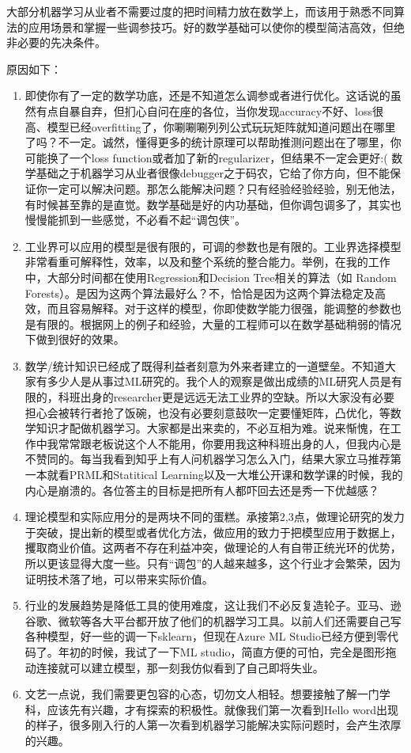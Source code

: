 \documentclass[]{ctexbook}
\begin{document}
大部分机器学习从业者不需要过度的把时间精力放在数学上，而该用于熟悉不同算法的应用场景和掌握一些调参技巧。好的数学基础可以使你的模型简洁高效，但绝非必要的先决条件。

原因如下：

\begin{enumerate}
\def\labelenumi{\arabic{enumi}.}
\item
  即使你有了一定的数学功底，还是不知道怎么调参或者进行优化。这话说的虽然有点自暴自弃，但扪心自问在座的各位，当你发现accuracy不好、loss很高、模型已经overfitting了，你唰唰唰列列公式玩玩矩阵就知道问题出在哪里了吗？不一定。诚然，懂得更多的统计原理可以帮助推测问题出在了哪里，你可能换了一个loss function或者加了新的regularizer，但结果不一定会更好:( 数学基础之于机器学习从业者很像debugger之于码农，它给了你方向，但不能保证你一定可以解决问题。那怎么能解决问题？只有经验经验经验，别无他法，有时候甚至靠的是直觉。数学基础是好的内功基础，但你调包调多了，其实也慢慢能抓到一些感觉，不必看不起``调包侠''。
\item
  工业界可以应用的模型是很有限的，可调的参数也是有限的。工业界选择模型非常看重可解释性，效率，以及和整个系统的整合能力。举例，在我的工作中，大部分时间都在使用Regression和Decision Tree相关的算法（如 Random Forests）。是因为这两个算法最好么？不，恰恰是因为这两个算法稳定及高效，而且容易解释。对于这样的模型，你即使数学能力很强，能调整的参数也是有限的。根据网上的例子和经验，大量的工程师可以在数学基础稍弱的情况下做到很好的效果。
\item
  数学/统计知识已经成了既得利益者刻意为外来者建立的一道壁垒。不知道大家有多少人是从事过ML研究的。我个人的观察是做出成绩的ML研究人员是有限的，科班出身的researcher更是远远无法工业界的空缺。所以大家没有必要担心会被转行者抢了饭碗，也没有必要刻意鼓吹一定要懂矩阵，凸优化，等数学知识才配做机器学习。大家都是出来卖的，不必互相为难。说来惭愧，在工作中我常常跟老板说这个人不能用，你要用我这种科班出身的人，但我内心是不赞同的。每当我看到知乎上有人问机器学习怎么入门，结果大家立马推荐第一本就看PRML和Statitical Learning以及一大堆公开课和数学课的时候，我的内心是崩溃的。各位答主的目标是把所有人都吓回去还是秀一下优越感？
\item
  理论模型和实际应用分的是两块不同的蛋糕。承接第2,3点，做理论研究的发力于突破，提出新的模型或者优化方法，做应用的致力于把模型应用于数据上，攫取商业价值。这两者不存在利益冲突，做理论的人有自带正统光环的优势，所以更该显得大度一些。只有``调包''的人越来越多，这个行业才会繁荣，因为证明技术落了地，可以带来实际价值。
\item
  行业的发展趋势是降低工具的使用难度，这让我们不必反复造轮子。亚马、逊谷歌、微软等各大平台都开放了他们的机器学习工具。以前人们还需要自己写各种模型，好一些的调一下sklearn，但现在Azure ML Studio已经方便到零代码了。年初的时候，我试了一下ML studio，简直方便的可怕，完全是图形拖动连接就可以建立模型，那一刻我仿似看到了自己即将失业。
\item
  文艺一点说，我们需要更包容的心态，切勿文人相轻。想要接触了解一门学科，应该先有兴趣，才有探索的积极性。就像我们第一次看到Hello word出现的样子，很多刚入行的人第一次看到机器学习能解决实际问题时，会产生浓厚的兴趣。
\end{enumerate}
\end{document}
